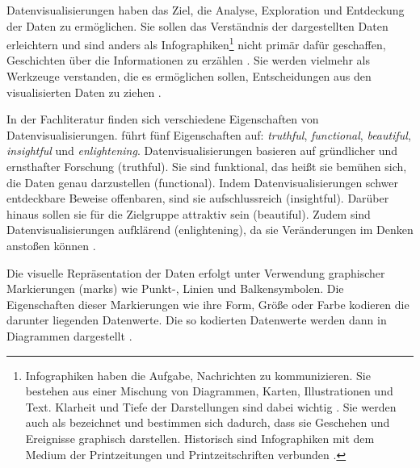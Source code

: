 Datenvisualisierungen haben das Ziel, die Analyse, Exploration und Entdeckung der Daten zu ermöglichen. Sie sollen das Verständnis der dargestellten Daten erleichtern
und sind anders als Infographiken\footnote{Infographiken haben die Aufgabe, Nachrichten zu kommunizieren.
Sie bestehen aus einer Mischung von Diagrammen, Karten, Illustrationen und Text. Klarheit und Tiefe der Darstellungen sind dabei wichtig
\cite[vgl.][31]{cairo_truthful_2016}. Sie werden auch als 
bezeichnet und bestimmen sich dadurch, dass sie Geschehen und Ereignisse graphisch darstellen. 
Historisch sind Infographiken mit dem Medium der Printzeitungen und Printzeitschriften verbunden \cite[vgl.][27]{kirk_data_2019}.}
nicht primär dafür geschaffen, Geschichten über die Informationen zu erzählen \cite[vgl.][20 ff.]{kirk_data_2019}. 
Sie werden vielmehr als Werkzeuge verstanden, die es ermöglichen sollen, Entscheidungen aus den visualisierten Daten zu ziehen \cite[vgl.][31]{cairo_truthful_2016}. %

In der Fachliteratur finden sich verschiedene Eigenschaften von Datenvisualisierungen. 
führt fünf Eigenschaften auf: \textit{truthful}, \textit{functional}, \textit{beautiful}, \textit{insightful} und \textit{enlightening}.
Datenvisualisierungen basieren auf gründlicher und ernsthafter Forschung (truthful). Sie sind funktional, das heißt
sie bemühen sich, die Daten genau darzustellen (functional). Indem Datenvisualisierungen schwer entdeckbare Beweise offenbaren, 
sind sie aufschlussreich (insightful). Darüber hinaus sollen sie für die Zielgruppe attraktiv sein (beautiful).
Zudem sind Datenvisualisierungen aufklärend (enlightening), da sie Veränderungen im Denken anstoßen können \cite[vgl.][45]{cairo_truthful_2016}. 

Die visuelle Repräsentation der Daten erfolgt unter Verwendung graphischer Markierungen (marks) wie Punkt-, 
Linien und Balkensymbolen. Die Eigenschaften dieser Markierungen wie ihre Form, Größe oder Farbe kodieren die
darunter liegenden Datenwerte. Die so kodierten Datenwerte werden dann in Diagrammen dargestellt \cite[vgl.][135 ff.]{kirk_data_2019}.

